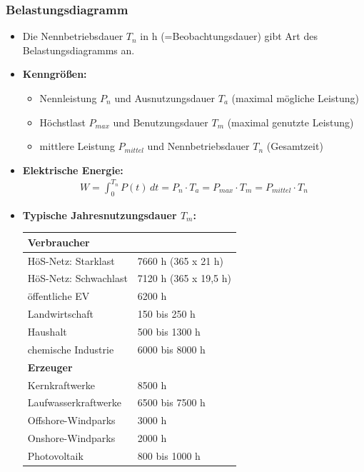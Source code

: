 \subsubsection{Belastungsdiagramm}
    {\small
        \begin{itemize}
        \item Die Nennbetriebsdauer \textbf{\(T_n\)} in h (=Beobachtungsdauer) gibt Art des Belastungsdiagramms an. 

        \item \textbf{Kenngrößen: }
            \begin{itemize}
                \item Nennleistung \(P_n\) und Ausnutzungsdauer \(T_a\) (maximal mögliche Leistung)
                \item Höchstlast \(P_{max}\) und Benutzungsdauer \(T_m\) (maximal genutzte Leistung)
                \item mittlere Leistung \(P_{mittel}\) und Nennbetriebsdauer \(T_n\) (Gesamtzeit)
            \end{itemize}

        \item \textbf{Elektrische Energie: }
            \begin{align*}
                W = \int_{0}^{T_n} P(t) \, dt = P_n \cdot T_a = P_{max} \cdot T_m = P_{mittel} \cdot T_n
            \end{align*}
        
        \item \textbf{Typische Jahresnutzungsdauer \(T_m\): }
            \begin{table}[H]
                \centering
                \small
                \begin{tabular}{l l}
                    \toprule
                    \textbf{Verbraucher} & \\
                    \midrule
                    HöS-Netz: Starklast & 7660 h (365 x 21 h) \\
                    HöS-Netz: Schwachlast & 7120 h (365 x 19,5 h) \\
                    öffentliche EV & 6200 h \\
                    Landwirtschaft & 150 bis 250 h \\
                    Haushalt & 500 bis 1300 h \\
                    chemische Industrie & 6000 bis 8000 h \\
                    \toprule
                    \textbf{Erzeuger} & \\
                    \midrule
                    Kernkraftwerke & 8500 h \\
                    Laufwasserkraftwerke & 6500 bis 7500 h \\
                    Offshore-Windparks & 3000 h \\
                    Onshore-Windparks & 2000 h \\
                    Photovoltaik & 800 bis 1000 h \\
                    \bottomrule
                \end{tabular}
            \end{table}


\end{itemize}}
